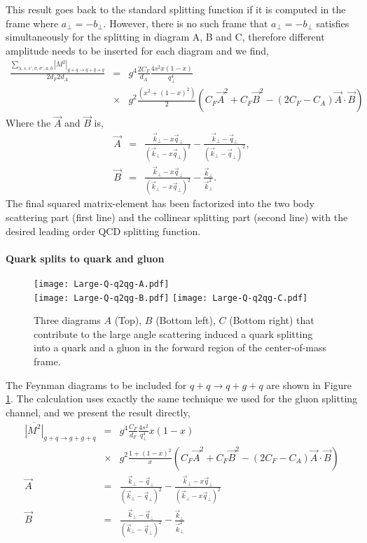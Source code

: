This result goes back to the standard splitting function if it is computed in the frame where $a_\perp = -b_\perp$. 
However, there is no such frame that $a_\perp = -b_\perp$ satisfies simultaneously for the splitting in diagram A, B and C, therefore different amplitude needs to be inserted for each diagram and we find,
\begin{eqnarray}
\frac{\sum_{\lambda, s, s', \sigma, \sigma', a, b}|M^2|_{g+q\rightarrow q+\bar{q}+q}}{2d_F 2d_A} &=& g^4 \frac{2C_F}{d_A}\frac{4s^2 x(1-x)}{q_\perp^4}  \\\nonumber
&\times& g^2\frac{(x^2+(1-x)^2)}{2} \left(C_F \vec{A}^2 + C_F \vec{B}^2 - (2C_F- C_A)\vec{A}\cdot\vec{B}\right)
\end{eqnarray}
Where the $\vec{A}$ and $\vec{B}$ is,
\begin{eqnarray}
\vec{A} &=& \frac{\vec{k}_\perp - x\vec{q}_\perp}{(\vec{k}_\perp - x\vec{q}_\perp)^2} -  \frac{\vec{k}_\perp - \vec{q}_\perp}{(\vec{k}_\perp - \vec{q}_\perp)^2}, \\
\vec{B} &=& \frac{\vec{k}_\perp - x\vec{q}_\perp}{(\vec{k}_\perp - x\vec{q}_\perp)^2} -  \frac{\vec{k}_\perp}{\vec{k}_\perp^2}.
\end{eqnarray}
The final squared matrix-element has been factorized into the two body scattering part (first line) and the collinear splitting part (second line) with the desired leading order QCD splitting function. 

\paragraph*{Quark splits to quark and gluon}
\begin{figure}
\centering
\texttt{[image: Large-Q-q2qg-A.pdf]}\\
\vspace{1em}
\texttt{[image: Large-Q-q2qg-B.pdf]}\hfill
\texttt{[image: Large-Q-q2qg-C.pdf]}
\caption{Three diagrams $A$ (Top), $B$ (Bottom left), $C$ (Bottom right) that contribute to the large angle scattering induced a quark splitting into a quark and a gluon in the forward region of the center-of-mass frame.}
\label{fig:feyn-q2qg}
\end{figure}

The Feynman diagrams to be included for $q+q\rightarrow q+g+q$ are shown in Figure \ref{fig:feyn-q2qg}.
The calculation uses exactly the same technique we used for the gluon splitting channel, and we present the result directly,
\begin{eqnarray}
\overline{|M^2|}_{g+q\rightarrow g+g+q} &=& 
 g^4 \frac{C_F}{d_F}\frac{4s^2}{q_\perp^4}x(1-x) \\\nonumber
&\times&g^2\frac{1+(1-x)^2}{x}  
\left(C_F\vec{A}^2 + C_F\vec{B}^2 - \left(2C_F-C_A\right)\vec{A}\cdot\vec{B}\right)\\
\vec{A} &=& \frac{\vec{k}_\perp - \vec{q}_\perp}{(\vec{k}_\perp - \vec{q}_\perp)^2} -  \frac{\vec{k}_\perp - x\vec{q}_\perp}{(\vec{k}_\perp - x\vec{q}_\perp)^2} \\
\vec{B} &=& \frac{\vec{k}_\perp - \vec{q}_\perp}{(\vec{k}_\perp - \vec{q}_\perp)^2} -  \frac{\vec{k}_\perp}{\vec{k}_\perp^2}
\end{eqnarray}


